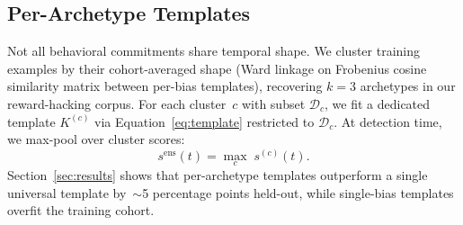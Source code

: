 \subsection{Per-Archetype Templates}
\label{sec:archetypes}

Not all behavioral commitments share temporal shape. We cluster training
examples by their cohort-averaged shape (Ward linkage on Frobenius cosine
similarity matrix between per-bias templates), recovering $k=3$ archetypes
in our reward-hacking corpus. For each cluster~$c$ with subset
$\mathcal{D}_c$, we fit a dedicated template $K^{(c)}$ via
Equation~\eqref{eq:template} restricted to $\mathcal{D}_c$. At detection
time, we max-pool over cluster scores:
\begin{equation}
  s^{\mathrm{ens}}(t) = \max_c\; s^{(c)}(t).
\end{equation}
Section~\ref{sec:results} shows that per-archetype templates outperform a
single universal template by~$\sim$5 percentage points held-out, while
single-bias templates overfit the training cohort.
